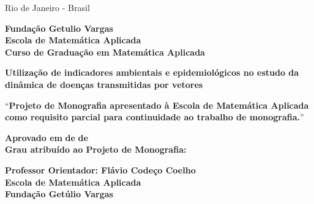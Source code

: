 \documentclass[12pt]{article}
\begin{document}
\par
\vfill
\begin{center}
{{\normalsize Rio de Janeiro - Brasil}\\
{\normalsize \the\year}}
\end{center}

\thispagestyle{empty}

\newpage
\begin{center}
\textbf{\LARGE Fundação Getulio Vargas}\\ 
\textbf{\LARGE Escola de Matemática Aplicada}\\
\textbf{\LARGE Curso de Graduação em Matemática Aplicada}

\par
\vspace{100pt}
\textbf{\Large Utilização de indicadores ambientais e epidemiológicos no estudo da dinâmica de doenças transmitidas por vetores}


\par
\vspace{65pt}

``\textbf{Projeto de Monografia apresentado à Escola de Matemática Aplicada como requisito parcial para continuidade ao trabalho de monografia.}''
\end{center}

\par
\vspace{65pt}
\begin{center}

\textbf{Aprovado em } \makebox[30pt]{\hrulefill}\textbf{ de }\makebox[120pt]{\hrulefill}\textbf{ de }\makebox[50pt]{\hrulefill}
\\
\vspace{5pt}
\textbf{Grau atribuído ao Projeto de Monografia:} \makebox[30pt]{\hrulefill}\\
\end{center}


\par
\vspace{40pt}
\begin{center}

\hrulefill

\vspace{5pt}
\textbf{Professor Orientador: Flávio Codeço Coelho}\\
\textbf{Escola de Matemática Aplicada}\\
\textbf{Fundação Getúlio Vargas}
\end{center}

\thispagestyle{empty}
\end{document}

